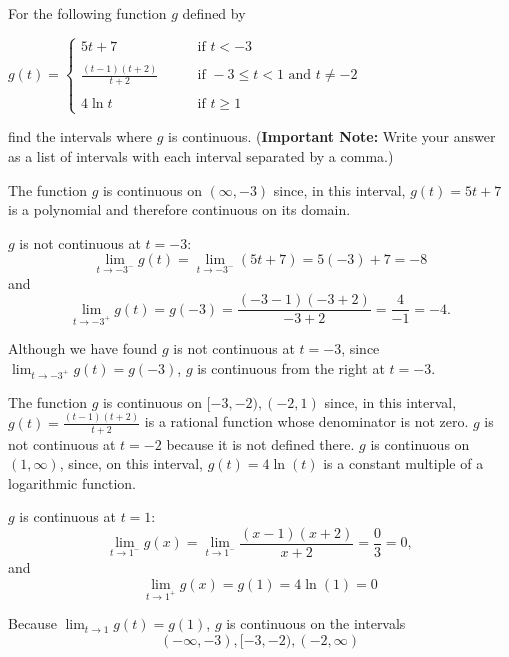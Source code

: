 \documentclass[nooutcomes,handout]{ximera}
\begin{document}
\begin{problem}
For the following function $g$ defined by
	
	$g(t) =   \left\{ \begin{array}{cl}
	5t + 7		 	&	\qquad \text{if } t < -3					\\ \\
	\frac{(t-1)(t+2)}{t+2}	&	\qquad \text{if } -3 \leq t < 1 \text{ and } t \neq -2	\\ \\
	4 \ln t				&	\qquad \text{if } t \geq 1					\end{array} \right.  $

  find the intervals where $g$ is continuous.  (\textbf{Important Note:} Write your answer as a list of intervals with each interval separated by a comma.)	

	\begin{freeResponse}
	The function $g$ is continuous on $(\infty, -3)$ since, in this interval, $g(t)=5t+7$ is a polynomial and therefore continuous on its domain.
  
  $g$ is not continuous at $t = -3$:
  \[
    \lim_{t \to -3^-} g(t) = \lim_{t \to -3^-} (5t+7) = 5(-3) + 7 = -8
  \]
  and
  \[
   \lim_{t \to -3^+} g(t)=g(-3) = \frac{(-3-1)(-3+2)}{-3+2} = \frac{4}{-1} = -4.
  \]

Although we have found $g$ is not continuous at $t = -3$, since $\lim_{t \to -3^+} g(t)=g(-3)$, $g$ is continuous from the right at $t=-3$.


  The function $g$ is continuous on $[-3, -2),(-2,1)$ since, in this interval, $g(t) = \frac{(t-1)(t+2)}{t+2}$ is a rational function whose denominator is not zero. $g$ is not continuous at $t=-2$ because it is not defined there.   $g$ is continuous on $(1, \infty)$, since, on this interval, $g(t) =  4 \ln(t)$ is a constant multiple of a  logarithmic function.

$g$ is continuous at $t = 1$:
  \[
    \lim_{t \to 1^-} g(x) = \lim_{t \to 1^-} \frac{(x-1)(x+2)}{x+2} = \frac{0}{3} = 0,
  \]
  and
\[ \lim_{t \to 1^+} g(x)=g(1) = 4 \ln(1) = 0\]


Because $\lim_{t \to 1} g(t)=g(1)$, $g$ is continuous on the intervals \[(-\infty, -3), [-3, -2), (-2, \infty)\]
  \end{freeResponse}
	
		
	
\end{problem}
	
	
			
\end{document}
